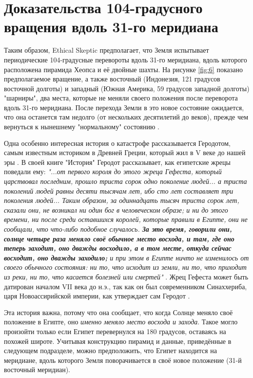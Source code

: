 \documentclass[10pt,twocolumn,letterpaper]{article}
\begin{document}
\section{Доказательства 104-градусного вращения вдоль 31-го меридиана}

Таким образом, Ethical Skeptic предполагает, что Земля испытывает периодические 104-градусные перевороты вдоль 31-го меридиана, вдоль которого расположена пирамида Хеопса и её двойные шахты. На рисунке \ref{fig:6} показано предполагаемое вращение, а также восточный (Индонезия, 121 градусов восточной долготы) и западный (Южная Америка, 59 градусов западной долготы) "шарниры", два места, которые не меняли своего положения после переворота вдоль 31-го меридиана. После перехода Земли в это новое состояние ожидается, что она останется там недолго (от нескольких десятилетий до веков), прежде чем вернуться к нынешнему "нормальному" состоянию \cite{150}.

Одна особенно интересная история о катастрофе рассказывается Геродотом, самым известным историком в Древней Греции, который жил в V веке до нашей эры \cite{31}. В своей книге "История" Геродот рассказывает, как египетские жрецы поведали ему: \textit{"...от первого короля до этого жреца Гефеста, который царствовал последним, прошло триста сорок одно поколение людей... а триста поколений людей равны десяти тысячам лет, ибо сто лет составляет три поколения людей... Таким образом, за одиннадцать тысяч триста сорок лет, сказали они, не возникал ни один бог в человеческом образе; и ни до этого времени, ни после среди оставшихся королей, которые правили в Египте, они не сообщали, что что-либо подобное случалось. \textbf{За это время, говорили они, солнце четыре раза меняло своё обычное место восхода, и там, где оно теперь заходит, оно дважды восходило, а в том месте, откуда сейчас восходит, оно дважды заходило;} и при этом в Египте ничто не изменилось от своего обычного состояния: ни то, что исходит из земли, ни то, что приходит из реки, ни то, что касается болезней или смертей"} \cite{32}. Жрец Гефеста может быть датирован началом VII века до н.э., так как он был современником Синаххериба, царя Новоассирийской империи, как утверждает сам Геродот \cite{32,33,34}.

Эта история важна, потому что она сообщает, что когда Солнце меняло своё положение в Египте, оно \textit{именно меняло место восхода и захода}. Такое могло произойти только если Египет перевернулся на 180 градусов, оставаясь на похожей широте. Учитывая конструкцию пирамид и данные, приведённые в следующем подразделе, можно предположить, что Египет находится на меридиане, вдоль которого Земля поворачивается в своё новое положение (31-й восточный меридиан).
\end{document}
